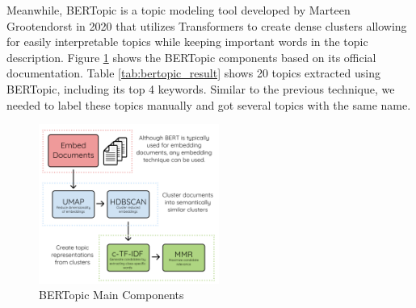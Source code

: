 \documentclass[12pt]{article}
\begin{document}
Meanwhile, BERTopic \cite{bertopic} is a topic modeling tool developed by Marteen Grootendorst in 2020 that utilizes Transformers to create dense clusters allowing for easily interpretable topics while keeping important words in the topic description. Figure \ref{fig:img_bertopic_main_components} shows the BERTopic components based on its official documentation. Table \ref{tab:bertopic_result} shows 20 topics extracted using BERTopic, including its top 4 keywords. Similar to the previous technique, we needed to label these topics manually and got several topics with the same name.

\begin{figure}[!h]
\begin{center}
\includegraphics[width=0.525\textwidth]{figures/image24.png}
\caption{BERTopic Main Components}
\label{fig:img_bertopic_main_components}
\end{center}
\end{figure}
\end{document}
